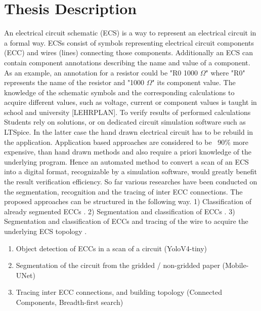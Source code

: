 \documentclass{article} %
\begin{document}
\section*{Thesis Description}
An electrical circuit schematic (ECS) is a way to represent an electrical circuit in a formal way. ECSs consist of symbols representing electrical circuit components (ECC) and wires (lines) connecting those components. Additionally an ECS can contain component annotations describing the name and value of a component. As an example, an annotation for a resistor could be "R0 1000 $\Omega$" where "R0" represents the name of the resistor and "1000 $\Omega$" its component value.
\lf
The knowledge of the schematic symbols and the corresponding calculations to acquire different values, such as voltage,  current  or component values is taught in school and university [LEHRPLAN]. To verify results of performed calculations Students rely on solutions, or on dedicated circuit simulation software such as LTSpice. In the latter case the hand drawn electrical circuit has to be rebuild in the application. Application based approaches are considered to be ~90\% more expensive, than hand drawn methods \cite{ctxindependentsvm} and also require a priori knowledge of the underlying program. Hence an automated method to convert a scan of an ECS into a digital format, recognizable by a simulation software, would greatly benefit the result verification efficiency.
\lf
So far various researches have been conducted on the segmentation, recognition and the tracing of inter ECC connections. The proposed approaches can be structured in the following way. 1) Classification of already segmented ECCs \cite{anngeo, basecnn, texturesmo}. 2) Segmentation and classification of ECCs \cite{seghogsvm, fouriersvm}. 3) Segmentation and classification of ECCs and tracing of the wire to acquire the underlying ECS topology \cite{knnfull}.
\lf
\begin{enumerate}
\item Object detection of ECCs in a scan of a circuit (YoloV4-tiny)
\item Segmentation of the circuit from the gridded / non-gridded paper (Mobile-UNet)
\item Tracing inter ECC connections, and building topology (Connected Components, Breadth-first search)
\end{enumerate}
\end{document}
